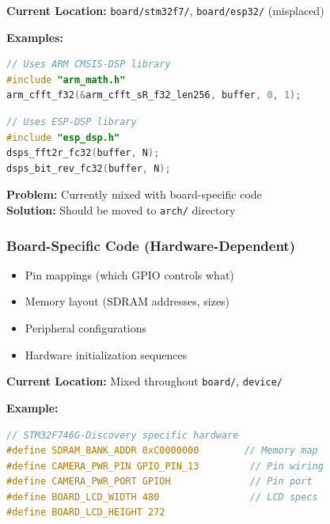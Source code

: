 \documentclass[11pt,a4paper]{article}
\begin{document}
\textbf{Current Location:} \texttt{board/stm32f7/}, \texttt{board/esp32/} (misplaced)

\textbf{Examples:}

\begin{lstlisting}[language=C,caption={ARM Cortex-M7 FFT (architecture-specific)}]
// Uses ARM CMSIS-DSP library
#include "arm_math.h"
arm_cfft_f32(&arm_cfft_sR_f32_len256, buffer, 0, 1);
\end{lstlisting}

\begin{lstlisting}[language=C,caption={Xtensa LX6 FFT (architecture-specific)}]
// Uses ESP-DSP library
#include "esp_dsp.h"
dsps_fft2r_fc32(buffer, N);
dsps_bit_rev_fc32(buffer, N);
\end{lstlisting}

\textbf{Problem:} Currently mixed with board-specific code \\
\textbf{Solution:} Should be moved to \texttt{arch/} directory

\subsubsection{Board-Specific Code (Hardware-Dependent)}

\begin{tcolorbox}[colback=boardgreen!10!white,colframe=boardgreen!75!black,title=Board Layer Characteristics]
\begin{itemize}
    \item Pin mappings (which GPIO controls what)
    \item Memory layout (SDRAM addresses, sizes)
    \item Peripheral configurations
    \item Hardware initialization sequences
\end{itemize}
\end{tcolorbox}

\textbf{Current Location:} Mixed throughout \texttt{board/}, \texttt{device/}

\textbf{Example:}
\begin{lstlisting}[language=C,caption={Board-specific configuration (STM32F746G-Discovery)}]
// STM32F746G-Discovery specific hardware
#define SDRAM_BANK_ADDR 0xC0000000        // Memory map
#define CAMERA_PWR_PIN GPIO_PIN_13         // Pin wiring
#define CAMERA_PWR_PORT GPIOH              // Pin port
#define BOARD_LCD_WIDTH 480                // LCD specs
#define BOARD_LCD_HEIGHT 272
\end{lstlisting}
\end{document}
